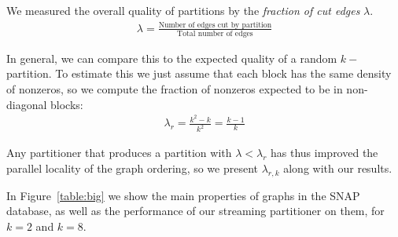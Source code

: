 \documentclass[11pt]{article}
\begin{document}
We measured the overall quality of partitions by the \textit{fraction of cut edges} $\lambda$.
\begin{align}\lambda = \frac{\text{Number of edges cut by partition}}{\text{Total number of edges}}\end{align}

In general, we can compare this to the expected quality of a random $k-$partition. To estimate this we just assume that each block has the same density of nonzeros, so we compute the fraction of nonzeros expected to be in non-diagonal blocks:
\begin{align}\lambda_r = \frac{k^2 - k}{k^2} = \frac{k-1}{k} \end{align}

Any partitioner that produces a partition with $\lambda < \lambda_r$ has thus improved the parallel locality of the graph ordering, so we present $\lambda_{r,k}$ along with our results.

In Figure~\ref{table:big} we show the main properties of graphs in the SNAP database, as well as the performance of our streaming partitioner on them, for $k=2$ and $k=8$. 
\end{document}
